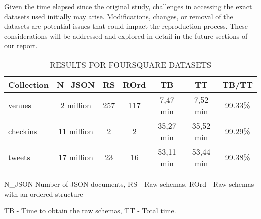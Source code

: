 \documentclass[sigconf, nonacm]{acmart}
\begin{document}
Given the time elapsed since the original study, challenges in accessing the exact datasets used initially may arise. Modifications, changes, or removal of the datasets are potential issues that could impact the reproduction process. These considerations will be addressed and explored in detail in the future sections of our report.

\begin{table}[h]
\centering
\caption{RESULTS FOR FOURSQUARE DATASETS \cite{frozza2018approach}} 
\scalebox{0.85} {
\begin{tabular}{|l|c|c|c|c|c|c|}
\hline
\textbf{Collection} & \textbf{N\_JSON} & \textbf{RS} & \textbf{ROrd} & \textbf{TB}      & \textbf{TT}   & \textbf{TB/TT}        \\ \hline
venues              & 2 million        & 257         & 117            & 7,47 min         & 7,52 min  &99.33\%        \\ \hline 
checkins            & 11 million       & 2           & 2              & 35,27 min        & 35,52 min  &99.29\%      \\ \hline
tweets              & 17 million       & 23          & 16             & 53,11 min        & 53,44 min   &99.38\%     \\ \hline
\end{tabular}
}
\newline
\newline
\newline
N\_JSON-Number of JSON documents, RS - Raw schemas, ROrd - Raw schemas with an ordered structure

TB - Time to obtain the raw schemas, TT - Total time.
\label{table:result}
\end{table}



\end{document}
